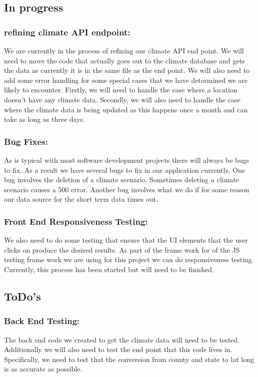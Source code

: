 \documentclass[onecolumn, draftclsnofoot,10pt, compsoc]{article}
\begin{document}
	\subsection{In progress}
		\subsubsection{refining climate API endpoint:}
		We are currently in the process of refining our climate API end point. We will need to move the code that actually goes out to the climate database and gets the data as currently it is in the same file as the end point. We will also need to add some error handling for some special cases that we have determined we are likely to encounter. Firstly, we will need to handle the case where a location doesn't have any climate data. Secondly, we will also need to handle the case where the climate data is being updated as this happens once a month and can take as long as three days.\\
		
		\subsubsection{Bug Fixes:}
		As is typical with most software development projects there will always be bugs to fix. As a result we have several bugs to fix in our application currently. One bug involves the deletion of a climate scenario. Sometimes deleting a climate scenario causes a 500 error. Another bug involves what we do if for some reason our data source for the short term data times out.\\
		
		\subsubsection{Front End Responsiveness Testing:}
		We also need to do some testing that ensure that the UI elements that the user clicks on produce the desired results. As part of the frame work for of the JS testing frame work we are using for this project we can do responsiveness testing. Currently, this process has been started but will need to be finished.\\

	\subsection{ToDo's}
		\subsubsection{Back End Testing:}
		The back end code we created to get the climate data will need to be tested. Additionally we will also need to test the end point that this code lives in. Specifically, we need to test that the conversion from county and state to lat long is as accurate as possible.\\
		
\end{document}
